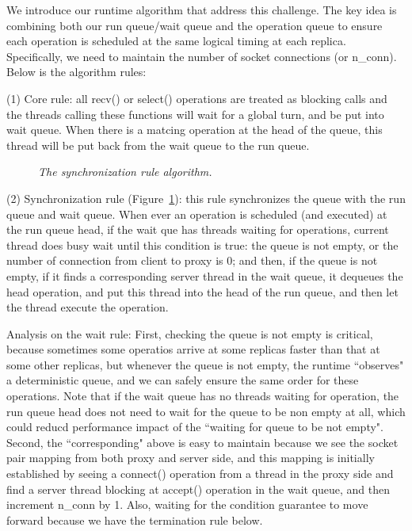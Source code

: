 We introduce our runtime algorithm that address this challenge. The key idea is 
combining both our \smt run queue/wait queue and the \paxos operation queue to 
ensure each \paxos operation is scheduled at the same logical timing at each 
replica. Specifically, we need to maintain %
the number of socket connections (or n\_conn). Below is the 
algorithm rules:

(1) Core rule: all recv() or select() operations are treated as blocking calls and the 
threads calling these functions will wait for a global \smt turn, and be put into wait 
queue. When there is a matcing \paxos operation at the head of the \paxos 
queue, this thread will be put back from the wait queue to the run queue.

\begin{figure}[t]
\centering
\begin{minipage}{.5\textwidth}
\end{minipage}
\vspace{-.1in}
\caption{{\em The synchronization rule algorithm.}} \label{fig:msmr-wait-rule}
\vspace{-.05in}
\end{figure}

(2) Synchronization rule (Figure~\ref{fig:msmr-wait-rule}): this rule synchronizes the \paxos queue with the 
\smt run queue and wait queue. When ever an operation is scheduled (and executed) at the \smt run queue 
head, if the wait que has threads waiting for \paxos operations, current thread does busy wait until
this condition is true: the \paxos queue is not empty, 
or the number of connection from client to proxy is 0; and then, if the \paxos 
queue is not empty, if it finds a 
corresponding server thread in the wait queue, it dequeues the head \paxos operation, 
and put this thread into the head of the run 
queue, and then let the thread execute the \paxos operation. 

Analysis on the wait rule: First, checking the \paxos queue is not 
empty is critical, because sometimes some operatios arrive at some replicas 
faster than that at some other replicas, but whenever the \paxos queue is not 
empty, the \smt runtime ``observes" a deterministic \paxos queue, and
we can safely ensure the same order for these \paxos operations.
Note that if the wait queue has no threads waiting for \paxos operation, the 
run queue head does not need to wait for the \paxos queue to be non empty at 
all, which could reducd performance impact of the ``waiting for \paxos queue to be not empty".
Second, the ``corresponding" above is easy to maintain because we see the socket pair mapping from 
both proxy and server side, and this mapping is initially established by seeing 
a connect() operation from a thread in the proxy side and find a server thread blocking at accept() 
operation in the wait queue, and then increment n\_conn by 1. Also, waiting for the 
condition guarantee to move forward because we have the termination rule below.

